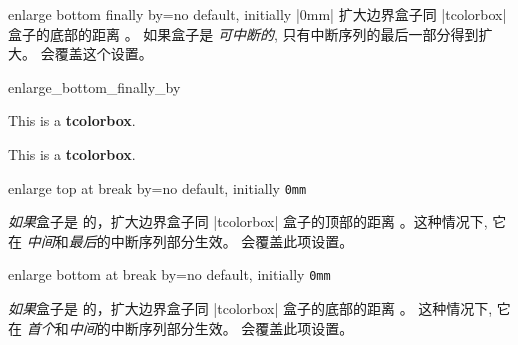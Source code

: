 \begin{docTcbKey}{enlarge bottom finally by}{=}{no default, initially |0mm|}
扩大边界盒子同 |tcolorbox| 盒子的底部的距离 。%
如果盒子是 \emph{可中断的}, 只有中断序列的最后一部分得到扩大。
 会覆盖这个设置。
\begin{exdispExample}{enlarge_bottom_finally_by}

\begin{tcolorbox}[enlarge bottom finally by=5mm]
This is a \textbf{tcolorbox}.
\end{tcolorbox}
\begin{tcolorbox}[enlarge bottom finally by=-5mm,enhanced,show bounding box]
This is a \textbf{tcolorbox}.
\end{tcolorbox}
\end{exdispExample}
\end{docTcbKey}




 
\begin{docTcbKey}{enlarge top at break by}{=}{no default, initially \texttt{0mm}}

\emph{如果}盒子是 的，扩大边界盒子同 |tcolorbox| 盒子的顶部的距离 。这种情况下, 它在 \emph{中间}和\emph{最后}的中断序列部分生效。  会覆盖此项设置。
\end{docTcbKey}


\begin{docTcbKey}{enlarge bottom at break by}{=}{no default, initially \texttt{0mm}}

\emph{如果}盒子是 的，扩大边界盒子同 |tcolorbox| 盒子的底部的距离 。
这种情况下, 它在 \emph{首个}和\emph{中间}的中断序列部分生效。
 会覆盖此项设置。
\end{docTcbKey}





